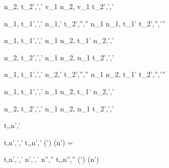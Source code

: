 
	{n_2,\sigma \handle{\iota} t_2',\sigma',\delta'}
	{v_1 \Trans n_2,\sigma \handle{\iota} v_1 \Trans t_2',\sigma',\delta'}
  {}


  {n_1,\sigma \handle{\iota} t_1',\sigma',\delta' \Quad
   n_1,\sigma' \handle{\iota} t_2',\sigma'',\delta''}
  {n_1 \Pair n_1,\sigma \handle{\iota} t_1' \Pair t_2',\sigma'',\delta'\cup\delta''}
  {}

  {n_1,\sigma \handle{\iota} t_1',\sigma',\delta'}
  {n_1 \Pair n_2,\sigma \handle{\iota} t_1' \Pair n_2,\sigma',\delta'}
  {}

  {n_2,\sigma \handle{\iota} t_2',\sigma',\delta'}
  {n_1 \Pair n_2,\sigma \handle{\iota} n_1 \Pair t_2',\sigma',\delta'}
  {}

  {n_1,\sigma \handle{\iota} t_1',\sigma',\delta' \Quad
   n_2,\sigma' \handle{\iota} t_2',\sigma'',\delta''}
  {n_1 \Choose n_2,\sigma \handle{\iota} t_1' \Choose t_2',\sigma'',\delta'\cup\delta''}
  {}

  {n_1,\sigma \handle{\iota} t_1',\sigma',\delta'}
  {n_1 \Choose n_2,\sigma \handle{\iota} t_1' \Choose n_2,\sigma',\delta'}
  {}

  {n_2,\sigma \handle{\iota} t_2',\sigma',\delta'}
  {n_1 \Choose n_2,\sigma \handle{\iota} n_1 \Choose t_2',\sigma',\delta'}
  {}




  {t,\sigma,\delta \fixate n',\sigma'}

  {t,\sigma \normalize n',\sigma',\delta'}
  {t,\sigma,\delta \fixate n',\sigma'}
  {(\delta \cup \delta') \cap \Watching(n') = \nothing}

  {t,\sigma \normalize n',\sigma',\delta' \Quad
   n',\sigma',\delta' \fixate n'',\sigma''}
  {t,\sigma,\delta \fixate n'',\sigma''}
  {(\delta \cup \delta') \cap \Watching(n') \neq \nothing}




